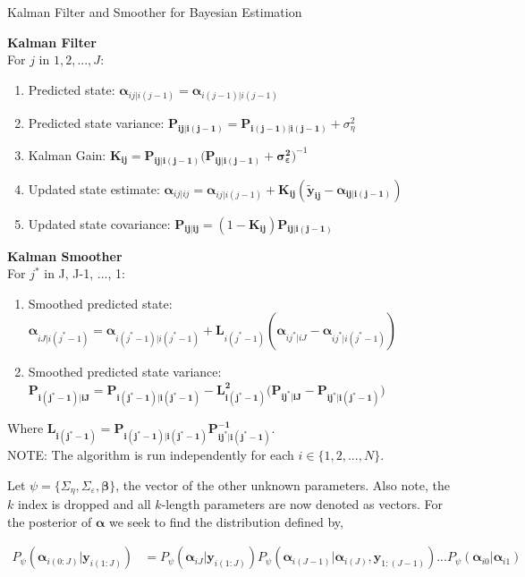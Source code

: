 \documentclass[
]{article}
\begin{document}
\begin{algorithm}
\caption{Kalman Filter and Smoother for Bayesian Estimation}\label{alg:bkfks}
\textbf{Kalman Filter}\\ 
For $j$ in $1, 2, ..., J$:
\begin{enumerate}
  \item {Predicted state:} $\boldsymbol{\alpha}_{ij|i(j-1)} = \boldsymbol{\alpha}_{i(j-1)|i(j-1)}$
  \item {Predicted state variance:} $\boldsymbol{P_{ij|i(j-1)} = P_{i(j-1)|i(j-1)}} + \sigma^2_\eta$
  \item {Kalman Gain:} $\boldsymbol{K_{ij}} = \boldsymbol{\boldsymbol{P}_{ij|i(j-1)}(\boldsymbol{P}_{ij|i(j-1)} + \sigma^2_\varepsilon})^{-1}$
  \item {Updated state estimate:} $\boldsymbol{\alpha}_{ij|ij} = \boldsymbol{\alpha}_{ij|i(j-1)} + \boldsymbol{K_{ij}} (\boldsymbol{\tilde y_{ij}- \alpha_{ij|i(j-1)}})$
  \item {Updated state covariance:} $\boldsymbol{P_{ij|ij}} = (1-\boldsymbol{K_{ij}})\boldsymbol{P_{ij|i(j-1)}}$
\end{enumerate}
\textbf{Kalman Smoother}\\  
For $j^*$ in J, J-1, ..., 1:
\begin{enumerate}
  \item Smoothed predicted state:  $\boldsymbol{\alpha}_{iJ|i(j^*-1)} =\boldsymbol{\alpha}_{i(j^*-1)|i(j^*-1)} + \boldsymbol{L}_{i(j^*-1)} (\boldsymbol{\alpha}_{ij^*|iJ} - \boldsymbol{\alpha}_{ij^*|i(j^*-1)})$
  \item Smoothed predicted state variance:  $\boldsymbol{P_{i(j^*-1)|iJ}} = \boldsymbol{P_{i(j^*-1)|i(j^*-1)}} - \boldsymbol{L_{i(j^*-1)}^2 (P_{ij^*|iJ} -P_{ij^*|i(j^*-1)}})$
\end{enumerate}
Where $\boldsymbol{L_{i(j^*-1)} = P_{{i(j^*-1)}|{i(j^*-1)}}  P^{-1}_{ij^*|i(j^*-1)}}$.\\
NOTE: The algorithm is run independently for each $i \in \{1, 2, ..., N\}$.
\end{algorithm}

Let \(\psi = \{\Sigma_\eta, \Sigma_\varepsilon, \boldsymbol{\beta}\}\), the vector of the other unknown parameters. Also note, the \(k\) index is dropped and all \(k\)-length parameters are now denoted as vectors. For the posterior of \(\boldsymbol{\alpha}\) we seek to find the distribution defined by,

\begin{equation*}
\begin{aligned}
P_\psi(\boldsymbol{\alpha}_{i(0:J)}|\boldsymbol{y}_{i(1:J)}) &=  P_\psi(\boldsymbol{\alpha}_{iJ}|\boldsymbol{y}_{i(1:J)})P_\psi(\boldsymbol{\alpha}_{i(J-1)}|\boldsymbol{\alpha}_{i(J)}, \boldsymbol{y}_{1:(J-1)}) ...  P_\psi(\boldsymbol{\alpha}_{i0}|\boldsymbol{\alpha}_{i1})
\end{aligned}
\end{equation*}
\end{document}

